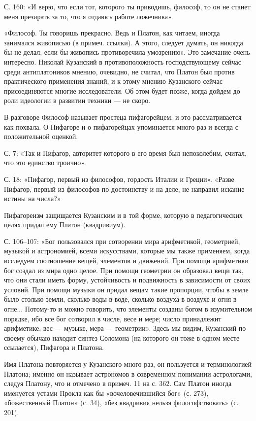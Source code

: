 С. 160: «И  верю, что если тот, которого ты  приводишь, философ, то он
не станет меня презирать за то, что я отдаюсь работе ложечника».

«Философ. Ты  говоришь прекрасно.  Ведь и  Платон, как  читаем, иногда
занимался живописью  (в примеч. ссылки).  А этого, следует  думать, он
никогда бы  не делал, если  бы живопись противоречила  умозрению». Это
замечание  очень  интересно.  Николай  Кузанский  в  противоположность
господствующему  сейчас  среди  антиплатоников  мнению,  очевидно,  не
считал, что  Платон был  против практического  применения знаний,  и к
этому мнению Кузанского сейчас присоединяются многие исследователи. Об
этом будет  позже, когда дойдем  до роли идеологии в  развитии техники
--- не скоро.

В   разговоре   Философ   называет  простеца   пифагорейцем,   и   это
рассматривается как  похвала. О Пифагоре и  о пифагорейцах упоминается
много раз и всегда с положительной оценкой.

С. 7: «Так и Пифагор, авторитет  которого в его время был непоколебим,
считал, что это единство троично».

С.  18: «Пифагор,  первый  из философов,  гордость  Италии и  Греции».
«Разве  Пифагор, первый  из философов  по  достоинству и  на деле,  не
направил искание истины на числа?»

Пифагореизм   защищается  Кузанским   и   в  той   форме,  которую   в
педагогических целях придал ему Платон (квадривиум).

С.  106--107:  «Бог  пользовался   при  сотворении  мира  арифметикой,
геометрией,  музыкой  и  астрономией, всеми  искусствами,  которые  мы
также  применяем,  когда  исследуем  соотношение  вещей,  элементов  и
движений. При  помощи арифметики  бог создал из  мира одно  целое. При
помощи геометрии  он образовал  вещи так, что  они стали  иметь форму,
устойчивость и подвижность в зависимости  от своих условий. При помощи
музыки он  придал вещам  такие пропорции, чтобы  в земле  было столько
земли, сколько воды в воде, сколько воздуха в воздухе и огня в огне...
Потому-то и можно говорить, что  элементы созданы богом в изумительном
порядке, ибо все бог сотворил в  числе, весе и мере; число принадлежит
арифметике,  вес ---  музыке,  мера ---  геометрии».  Здесь мы  видим,
Кузанский по  своему обычаю  находит синтез  Соломона (на  которого он
тоже в одном месте ссылается), Пифагора и Платона.

Имя  Платона  повторяется у  Кузанского  много  раз, он  пользуется  и
терминологией  Платона; именно  он называет  астрономов в  современном
понимании  астрологами,  следуя  Платону,  что и  отмечено  в  примеч.
11  на с.  362.  Сам  Платон иногда  именуется  устами  Прокла как  бы
«вочеловечившийся бог»  (с. 273), «божественный Платон»  (с. 34), «без
квадривия нельзя философствовать» (с. 201).

